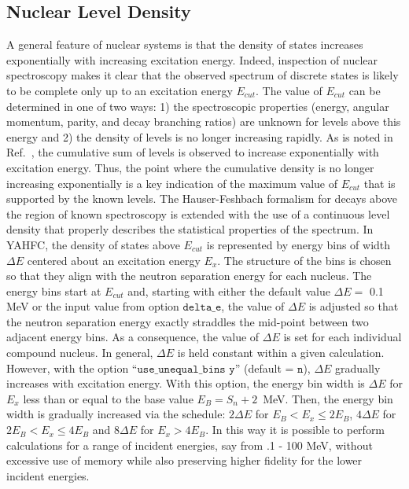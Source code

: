 \documentclass[
10pt,
showpacs,preprintnumbers,footinbib,
amsfonts,amsmath,amssymb,
aps,
prc,twocolumn,groupedaddress,superscriptaddress,
showkeys,
nofootinbib
]{revtex4-1}
\begin{document}
\subsection{Nuclear Level Density}
\label{sec:LD}

A general feature of nuclear systems is that the density of states increases exponentially with increasing excitation energy. Indeed, inspection of nuclear spectroscopy makes it clear that the observed spectrum of discrete states is likely to be complete only up to an excitation energy $E_{cut}$. The value of $E_{cut}$ can be determined in one of two ways: 1) the spectroscopic properties (energy, angular momentum, parity, and decay branching ratios) are unknown for levels above this energy and 2) the density of levels is no longer increasing rapidly. 
As is noted in Ref.~\cite{Gilbert:1965}, the cumulative sum of levels is observed to increase exponentially with excitation energy. Thus, the point where the cumulative density is no longer increasing exponentially is a key indication of the maximum value of $E_{cut}$ that is supported by the known levels.
The Hauser-Feshbach formalism for decays above the region of known spectroscopy is extended with the use of a continuous level density that properly describes the statistical properties of the spectrum. In YAHFC, the density of states above $E_{cut}$ is represented by energy bins of width 
$\Delta E$ centered about an excitation energy $E_x$. The structure of the bins is chosen so that they align with the neutron separation energy for each nucleus. The energy bins start at $E_{cut}$ and, starting with either the default value $\Delta E = $ 0.1 MeV or the input value from option 
${\texttt{delta\_e}}$, the value of $\Delta E$ is adjusted so that the neutron separation energy exactly straddles the mid-point between two adjacent energy bins. As a consequence, the value of $\Delta E$ is set for each individual compound nucleus. In general, $\Delta E$ is held constant within a given calculation. However, with the option 
``${\texttt{use\_unequal\_bins y}}$'' (default = ${\texttt{n}}$), $\Delta E$ gradually increases with excitation energy. With this option, the energy bin width is $\Delta E$ for $E_x$ less than or equal to the base value $E_B = S_n + 2$~MeV. Then, the energy bin width is gradually increased via the schedule: $2\Delta E$ for $E_B < E_x \le 2E_B$, $4\Delta E$ for $2E_B < E_x \le 4E_B$ and $8\Delta E$ for $E_x > 4E_B$. In this way it is possible to perform calculations for a range of incident energies, say from .1 - 100 MeV, without excessive use of memory while also preserving higher fidelity for the lower incident energies.
\end{document}
